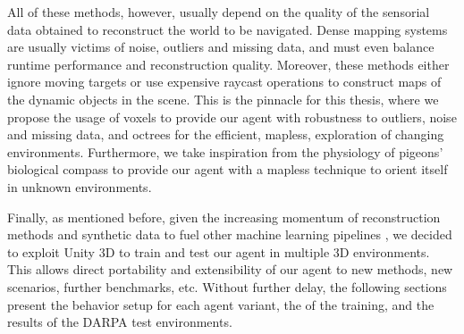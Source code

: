 All of these methods, however, usually depend on the quality of the sensorial data obtained to reconstruct the world to be navigated.
Dense mapping systems are usually victims of noise, outliers and missing data, and must even balance runtime performance and reconstruction quality. Moreover, these methods either ignore moving targets or use expensive raycast operations to construct maps of the dynamic objects in the scene. \cite{mapless, margarita} %
This is the pinnacle for this thesis, where we propose the usage of voxels to provide our agent with robustness to outliers, noise and missing data, and octrees for the efficient, mapless, exploration of changing environments. 
Furthermore, we take inspiration from the physiology of pigeons' biological compass to provide our agent with a mapless technique to orient itself in unknown environments.

Finally, as mentioned before, given the increasing momentum of reconstruction methods and synthetic data to fuel other machine learning pipelines \cite{plenoxels, nvidia}, we decided to exploit Unity 3D to train and test our agent in multiple 3D environments. This allows direct portability and extensibility of our agent to new methods, new scenarios, further benchmarks, etc. 
Without further delay, the following sections present the behavior setup for each agent variant, the of the training, and the results of the DARPA test environments.








